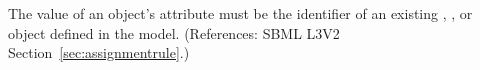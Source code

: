 The value of an \AssignmentRule object's  attribute must be
the identifier of an existing \Compartment, \Species, \Parameter or
\SpeciesReference object defined in the model.  (References: SBML L3V2
Section~\ref{sec:assignmentrule}.)
